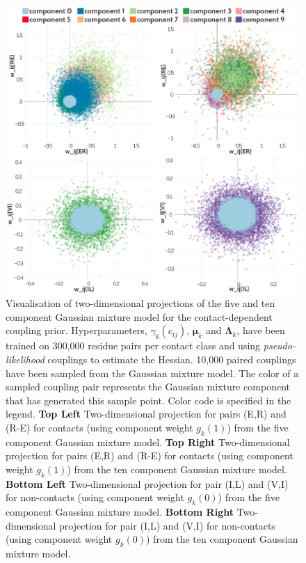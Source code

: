 \documentclass[11pt,a4paper,twoside]{book}
\newcommand{\Lk}{\mathbf{\Lambda}_k}
\newcommand{\muk}{\mathbf{\mu}_k}
\newcommand{\cij}{c_{ij}}
\theoremstyle{definition}
\theoremstyle{definition}
\theoremstyle{remark}
\begin{document}
\begin{figure}
\includegraphics[width=1\linewidth]{img/bayesian_model/pll/2dvis_combined_5comp_10comp_300k} \caption{Visualisation of two-dimensional
projections of the five and ten component Gaussian mixture model for the
contact-dependent coupling prior. Hyperparameters, \(\gamma_k(\cij)\),
\(\muk\) and \(\Lk\), have been trained on 300,000 residue pairs per
contact class and using \emph{pseudo-likelihood} couplings to estimate
the Hessian. 10,000 paired couplings have been sampled from the Gaussian
mixture model. The color of a sampled coupling pair represents the
Gaussian mixture component that has generated this sample point. Color
code is specified in the legend. \textbf{Top Left} Two-dimensional
projection for pairs (E,R) and (R-E) for contacts (using component
weight \(g_k(1)\)) from the five component Gaussian mixture model.
\textbf{Top Right} Two-dimensional projection for pairs (E,R) and (R-E)
for contacts (using component weight \(g_k(1)\)) from the ten component
Gaussian mixture model. \textbf{Bottom Left} Two-dimensional projection
for pair (I,L) and (V,I) for non-contacts (using component weight
\(g_k(0)\)) from the five component Gaussian mixture model.
\textbf{Bottom Right} Two-dimensional projection for pair (I,L) and
(V,I) for non-contacts (using component weight \(g_k(0)\)) from the ten
component Gaussian mixture model.}\label{fig:vis2d-pll-5-10-comp-300k}
\end{figure}
\end{document}
